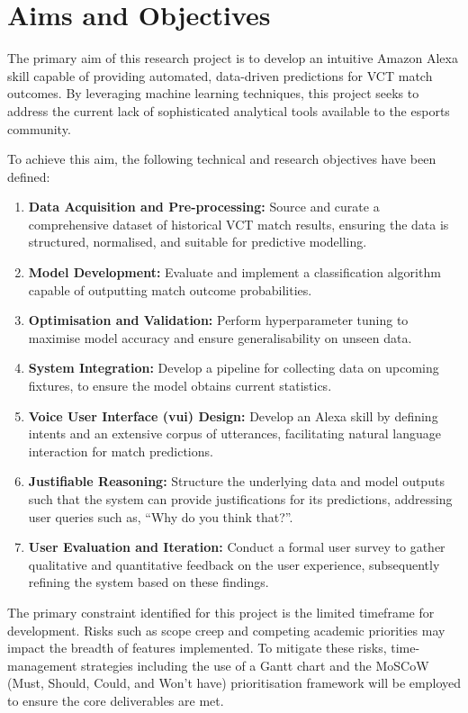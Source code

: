 \section{Aims and Objectives}
The primary aim of this research project is to develop an intuitive Amazon Alexa skill capable of providing automated, data-driven predictions for VCT match outcomes. By leveraging machine learning techniques, this project seeks to address the current lack of sophisticated analytical tools available to the esports community.

To achieve this aim, the following technical and research objectives have been defined:
\label{chap:objectives}

\begin{enumerate}
\item \textbf{Data Acquisition and Pre-processing:} Source and curate a comprehensive dataset of historical VCT match results, ensuring the data is structured, normalised, and suitable for predictive modelling.
\item \textbf{Model Development:} Evaluate and implement a classification algorithm capable of outputting match outcome probabilities.
\item \textbf{Optimisation and Validation:} Perform hyperparameter tuning to maximise model accuracy and ensure generalisability on unseen data.
\item \textbf{System Integration:} Develop a pipeline for collecting data on upcoming fixtures, to ensure the model obtains current statistics.
\item \textbf{Voice User Interface (\gls{vui}) Design:} Develop an Alexa skill by defining intents and an extensive corpus of utterances, facilitating natural language interaction for match predictions.
\item \textbf{Justifiable Reasoning:} Structure the underlying data and model outputs such that the system can provide justifications for its predictions, addressing user queries such as, ``Why do you think that?''.
\item \textbf{User Evaluation and Iteration:} Conduct a formal user survey to gather qualitative and quantitative feedback on the user experience, subsequently refining the system based on these findings.
\end{enumerate}

The primary constraint identified for this project is the limited timeframe for development. Risks such as scope creep and competing academic priorities may impact the breadth of features implemented. To mitigate these risks, time-management strategies including the use of a Gantt chart and the MoSCoW (Must, Should, Could, and Won't have) prioritisation framework will be employed to ensure the core deliverables are met.

